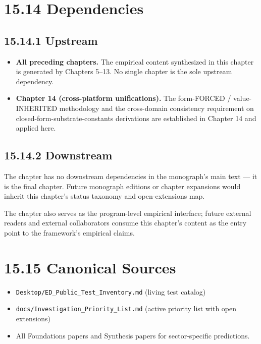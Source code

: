 \documentclass[11pt]{book}
\begin{document}
\section{15.14 Dependencies}

\subsection{15.14.1 Upstream}

\begin{itemize}
\item \textbf{All preceding chapters.} The empirical content synthesized in this chapter is generated by Chapters 5–13. No single chapter is the sole upstream dependency.
\item \textbf{Chapter 14 (cross-platform unifications).} The form-FORCED / value-INHERITED methodology and the cross-domain consistency requirement on closed-form-substrate-constants derivations are established in Chapter 14 and applied here.
\end{itemize}

\subsection{15.14.2 Downstream}

The chapter has no downstream dependencies in the monograph's main text — it is the final chapter. Future monograph editions or chapter expansions would inherit this chapter's status taxonomy and open-extensions map.

The chapter also serves as the program-level empirical interface; future external readers and external collaborators consume this chapter's content as the entry point to the framework's empirical claims.

\section{15.15 Canonical Sources}

\begin{itemize}
\item \texttt{Desktop/ED\_Public\_Test\_Inventory.md} (living test catalog)
\item \texttt{docs/Investigation\_Priority\_List.md} (active priority list with open extensions)
\item All Foundations papers and Synthesis papers for sector-specific predictions.
\end{itemize}
\end{document}
